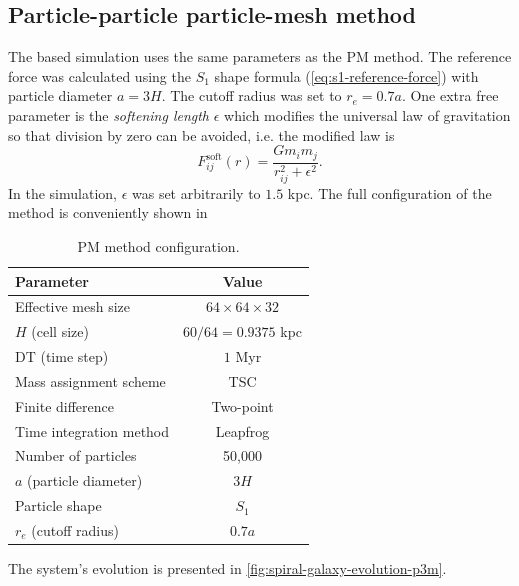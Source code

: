 \subsection{Particle-particle particle-mesh method}
The \PThreeM{} based simulation uses the same parameters as the PM method.
The reference force was calculated using the $S_1$ shape formula (\autoref{eq:s1-reference-force}) with particle diameter $a=3H$.
The cutoff radius was set to $r_e=0.7a$.
One extra free parameter is the \textit{softening length} $\epsilon$ which modifies the universal law of gravitation so that division by zero can be avoided, i.e. the modified law is
\begin{equation*}
    F^\text{soft}_{ij}(r) = \frac{G m_i m_j}{r_{ij}^2 + \epsilon^2}.
\end{equation*}
In the simulation, $\epsilon$ was set arbitrarily to $1.5$ kpc.
The full configuration of the \PThreeM{} method is conveniently shown in
\begin{table}[htp]
    \centering
    \begin{tabular}{|l|c|}
        \hline
        \textbf{Parameter}      & \textbf{Value}           \\
        \hline
        Effective mesh size     & $64 \times 64 \times 32$ \\
        $H$ (cell size)         & $60/64=0.9375$ kpc       \\
        DT (time step)          & $1$ Myr                  \\
        Mass assignment scheme  & TSC                      \\
        Finite difference       & Two-point                \\
        Time integration method & Leapfrog                 \\
        Number of particles     & 50,000                   \\
        $a$ (particle diameter) & $3H$                     \\
        Particle shape          & $S_1$                    \\
        $r_e$ (cutoff radius)   & $0.7a$                   \\
        \hline
    \end{tabular}
    \caption{PM method configuration.}
    \label{tab:p3m-method-parameters}
\end{table}
The system's evolution is presented in \autoref{fig:spiral-galaxy-evolution-p3m}.
